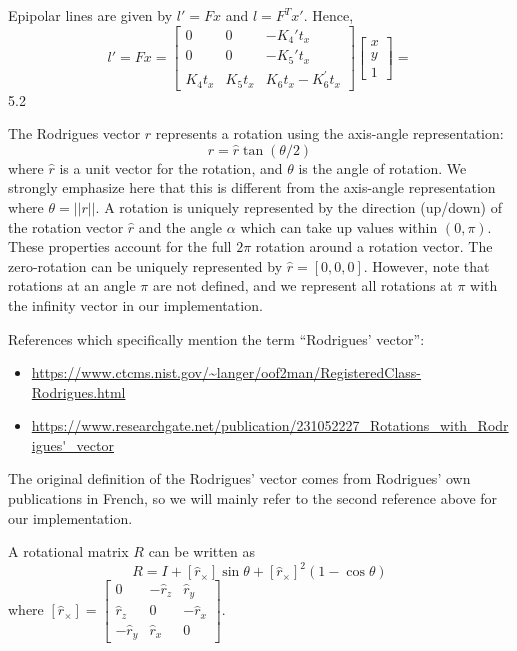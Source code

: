 \documentclass{scrbook}
\begin{document}
Epipolar lines are given by $l'=Fx$ and $l=F^{T}x'$. Hence,
\begin{equation*}
l'=Fx=\left[\begin{array}{ccc}
0 & 0 & -K_{4}'t_{x}\\
0 & 0 & -K_{5}'t_{x}\\
K_{4}t_{x} & K_{5}t_{x} & K_{6}t_{x}-{K}_{6}^{'}t_{x}
\end{array}\right]\left[\begin{array}{c}
x\\
y\\
1
\end{array}\right]=
\end{equation*}
5.2

The Rodrigues vector $r$ represents a rotation using the axis-angle representation:
\begin{equation*}
r=\hat{r}\tan (\theta /2)
\end{equation*}
where $\hat{r}$ is a unit vector for the rotation, and $\theta $ is the angle of rotation. We strongly emphasize here that this is different from the axis-angle representation where $\theta =\left| \left| r\right| \right| $. A rotation is uniquely represented by the direction (up/down) of the rotation vector $\hat{r}$ and the angle $\alpha $ which can take up values within $(0,\pi )$. These properties account for the full $2\pi $ rotation around a rotation vector. The zero-rotation can be uniquely represented by $\hat{r}=\left[0,0,0\right]$. However, note that rotations at an angle $\pi $ are not defined, and we represent all rotations at $\pi $ with the infinity vector in our implementation.

References which specifically mention the term ``Rodrigues’ vector'':
\begin{itemize}
\item \url{https://www.ctcms.nist.gov/~langer/oof2man/RegisteredClass-Rodrigues.html}
\item \url{https://www.researchgate.net/publication/231052227_Rotations_with_Rodrigues'_vector}
\end{itemize}
The original definition of the Rodrigues’ vector comes from Rodrigues’ own publications in French, so we will mainly refer to the second reference above for our implementation.

A rotational matrix $R$ can be written as
\begin{equation*}
R=I+\left[\hat{r}_{\times }\right]\sin \theta +\left[\hat{r}_{\times }\right]^{2}\left(1-\cos \theta \right)
\end{equation*}
where $\left[\hat{r}_{\times }\right]=\left[\begin{array}{ccc}
0 & -\hat{r}_{z} & \hat{r}_{y}\\
\hat{r}_{z} & 0 & -\hat{r}_{x}\\
-\hat{r}_{y} & \hat{r}_{x} & 0
\end{array}\right]$.
\end{document}
